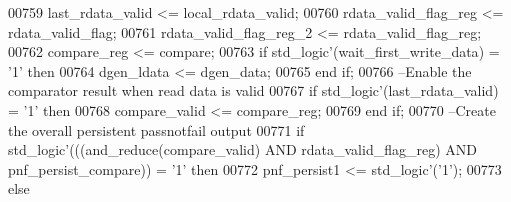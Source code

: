\begin{DoxyCode}
00759       \textcolor{vhdlchar}{last_rdata_valid} \textcolor{vhdlchar}{<=} \textcolor{vhdlchar}{local_rdata_valid};
00760       \textcolor{vhdlchar}{rdata_valid_flag_reg} \textcolor{vhdlchar}{<=} \textcolor{vhdlchar}{rdata_valid_flag};
00761       \textcolor{vhdlchar}{rdata_valid_flag_reg_2} \textcolor{vhdlchar}{<=} \textcolor{vhdlchar}{rdata_valid_flag_reg};
00762       \textcolor{vhdlchar}{compare_reg} \textcolor{vhdlchar}{<=} \textcolor{vhdlchar}{compare};
00763       \textcolor{keywordflow}{if} \textcolor{comment}{std\_logic}\textcolor{vhdlchar}{'}\textcolor{vhdlchar}{(}\textcolor{vhdlchar}{wait_first_write_data}\textcolor{vhdlchar}{)} \textcolor{vhdlchar}{=} \textcolor{vhdlchar}{'}\textcolor{vhdllogic}{}\textcolor{vhdllogic}{1}\textcolor{vhdlchar}{'} \textcolor{keywordflow}{then} 
00764         \textcolor{vhdlchar}{dgen_ldata} \textcolor{vhdlchar}{<=} \textcolor{vhdlchar}{dgen_data};
00765       \textcolor{keywordflow}{end} \textcolor{keywordflow}{if};
00766 \textcolor{keyword}{      --Enable the comparator result when read data is valid}
00767       \textcolor{keywordflow}{if} \textcolor{comment}{std\_logic}\textcolor{vhdlchar}{'}\textcolor{vhdlchar}{(}\textcolor{vhdlchar}{last_rdata_valid}\textcolor{vhdlchar}{)} \textcolor{vhdlchar}{=} \textcolor{vhdlchar}{'}\textcolor{vhdllogic}{}\textcolor{vhdllogic}{1}\textcolor{vhdlchar}{'} \textcolor{keywordflow}{then} 
00768         \textcolor{vhdlchar}{compare_valid} \textcolor{vhdlchar}{<=} \textcolor{vhdlchar}{compare_reg};
00769       \textcolor{keywordflow}{end} \textcolor{keywordflow}{if};
00770 \textcolor{keyword}{      --Create the overall persistent passnotfail output}
00771       \textcolor{keywordflow}{if} \textcolor{comment}{std\_logic}\textcolor{vhdlchar}{'}\textcolor{vhdlchar}{(}\textcolor{vhdlchar}{(}\textcolor{vhdlchar}{(}\textcolor{vhdlchar}{and\_reduce}\textcolor{vhdlchar}{(}\textcolor{vhdlchar}{compare_valid}\textcolor{vhdlchar}{)} \textcolor{keywordflow}{AND} \textcolor{vhdlchar}{rdata_valid_flag_reg}\textcolor{vhdlchar}{)} \textcolor{keywordflow}{AND} \textcolor{vhdlchar}{
      pnf_persist_compare}\textcolor{vhdlchar}{)}\textcolor{vhdlchar}{)} \textcolor{vhdlchar}{=} \textcolor{vhdlchar}{'}\textcolor{vhdllogic}{}\textcolor{vhdllogic}{1}\textcolor{vhdlchar}{'} \textcolor{keywordflow}{then} 
00772         \textcolor{vhdlchar}{pnf_persist1} \textcolor{vhdlchar}{<=} \textcolor{comment}{std\_logic}\textcolor{vhdlchar}{'}\textcolor{vhdlchar}{(}\textcolor{vhdlchar}{'}\textcolor{vhdllogic}{}\textcolor{vhdllogic}{1}\textcolor{vhdlchar}{'}\textcolor{vhdlchar}{)};
00773       \textcolor{keywordflow}{else}

\end{DoxyCode}
